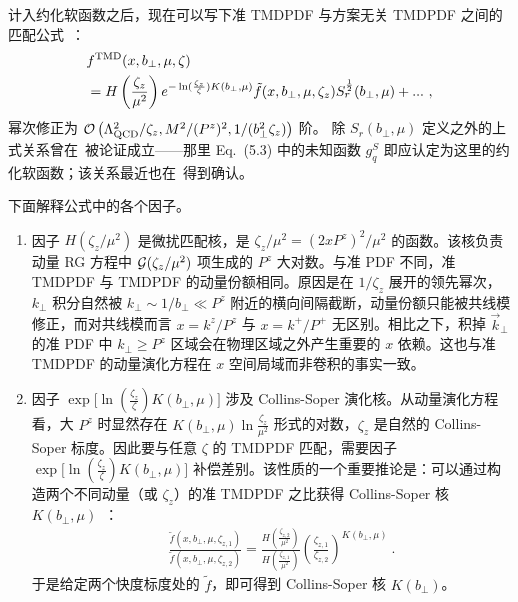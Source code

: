 计入约化软函数之后，现在可以写下准 TMDPDF 与方案无关 TMDPDF 之间的匹配公式~\cite{Ji:2019ewn}：
\begin{align}\label{eq:quasiTMDmatch}
	&f^{\rm TMD}(x,b_\perp,\mu,\zeta)\\
	&=H\left(\frac{\zeta_z}{\mu^2}\right) e^{-\ln (\frac{\zeta_z}{\zeta})K(b_\perp,\mu)}\tilde f(x,b_\perp,\mu,\zeta_z)S_r^{\frac{1}{2}}(b_\perp,\mu)+...\ ,\nonumber
\end{align}
幂次修正为 ${\cal O}\left(\Lambda_{\rm QCD}^2/\zeta_z,M^2/(P^z)^2,1/(b^2_\perp\zeta_z) \right)$ 阶。
除 $S_r(b_\perp,\mu)$ 定义之外的上式关系曾在~\cite{Ebert:2019okf}被论证成立——那里 Eq.~(5.3) 中的未知函数 $g_q^S$ 即应认定为这里的约化软函数；该关系最近也在~\cite{Vladimirov:2020ofp}得到确认。


下面解释公式中的各个因子。

\begin{enumerate}
	\item 因子 $ H(\zeta_z/\mu^2)$ 是微扰匹配核，是 $\zeta_z/\mu^2=(2xP^z)^2/\mu^2$ 的函数。该核负责动量 RG 方程中 ${\cal G}(\zeta_z/\mu^2)$ 项生成的 $P^z$ 大对数。与准 PDF 不同，准 TMDPDF 与 TMDPDF 的动量份额相同。原因是在 $1/\zeta_z$ 展开的领先幂次，$k_\perp$ 积分自然被 $k_\perp \sim 1/b_\perp \ll P^z$ 附近的横向间隔截断，动量份额只能被共线模修正，而对共线模而言 $x=k^z/P^z$ 与 $x=k^+/P^+$ 无区别。相比之下，积掉 $\vec{k}_\perp$ 的准 PDF 中 $k_\perp \ge P^z$ 区域会在物理区域之外产生重要的 $x$ 依赖。这也与准 TMDPDF 的动量演化方程在 $x$ 空间局域而非卷积的事实一致。
	\item 因子 $\exp\big[\ln (\frac{\zeta_z}{\zeta})K(b_\perp,\mu)\big]$ 涉及 Collins-Soper 演化核。从动量演化方程看，大 $P^z$ 时显然存在 $K(b_\perp,\mu)\ln \frac{\zeta_z}{\mu^2}$ 形式的对数，$\zeta_z$ 是自然的 Collins-Soper 标度。因此要与任意 $\zeta$ 的 TMDPDF 匹配，需要因子 $\exp\big[\ln (\frac{\zeta_z}{\zeta})K(b_\perp,\mu)\big]$ 补偿差别。该性质的一个重要推论是：可以通过构造两个不同动量（或 $\zeta_z$）的准 TMDPDF 之比获得 Collins-Soper 核 $K(b_\perp,\mu)$~\cite{Ebert:2018gzl}：
	\begin{align}
		\label{eq:TMD-CS_kernel}
		\ \ \quad\frac{\tilde f(x,b_\perp,\mu,\zeta_{z,1})}{\tilde f(x,b_\perp,\mu,\zeta_{z,2})}=\frac{H\left(\frac{\zeta_{z,2}}{\mu^2}\right)}{H\left(\frac{\zeta_{z,1}}{\mu^2}\right)}\left(\frac{\zeta_{z,1}}{\zeta_{z,2}}\right)^{K(b_\perp,\mu)} \ .
	\end{align}
	于是给定两个快度标度处的 $\tilde f$，即可得到 Collins-Soper 核 $K(b_\perp)$。

\end{enumerate}

